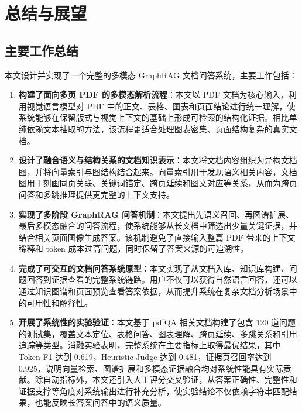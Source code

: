 
\chapter{总结与展望}\label{ch:conclusion}

\section{主要工作总结}\label{sec:summary}

本文设计并实现了一个完整的多模态 GraphRAG 文档问答系统，主要工作包括：

\begin{enumerate}[label=（\arabic*）]
\item \textbf{构建了面向多页 PDF 的多模态解析流程}：本文以 PDF 文档为核心输入，利用视觉语言模型对 PDF 中的正文、表格、图表和页面结论进行统一理解，使系统能够在保留版式与视觉上下文的基础上形成可检索的结构化证据。相比单纯依赖文本抽取的方法，该流程更适合处理图表密集、页面结构复杂的真实文档。
\item \textbf{设计了融合语义与结构关系的文档知识表示}：本文将文档内容组织为异构文档图，并将向量索引与图结构结合起来。向量索引用于发现语义相关内容，文档图用于刻画同页关联、关键词锚定、跨页延续和图文对应等关系，从而为跨页问答和多跳推理提供更完整的上下文支持。
\item \textbf{实现了多阶段 GraphRAG 问答机制}：本文提出先语义召回、再图谱扩展、最后多模态融合的问答流程，使系统能够从长文档中筛选出少量关键证据，并结合相关页面图像生成答案。该机制避免了直接输入整篇 PDF 带来的上下文稀释和 token 成本过高问题，同时保留了答案来源的可追溯性。
\item \textbf{完成了可交互的文档问答系统原型}：本文实现了从文档入库、知识库构建、问题回答到证据查看的完整系统链路。用户不仅可以获得自然语言回答，还可以通过知识图谱和页面预览查看答案依据，从而提升系统在复杂文档分析场景中的可用性和解释性。
\item \textbf{开展了系统性的实验验证}：本文基于 pdfQA 相关文档构建了包含 120 道问题的测试集，覆盖文本定位、表格问答、图表理解、跨页延续、多跳关系和引用追踪等类型。消融实验表明，完整系统在主要指标上取得最优结果，其中 Token F1 达到 0.619，Heuristic Judge 达到 0.481，证据页召回率达到 0.925，说明向量检索、图谱扩展和多模态证据融合均对系统性能具有实际贡献。除自动指标外，本文还引入人工评分交叉验证，从答案正确性、完整性和证据支撑等角度对系统输出进行补充分析，使实验结论不仅依赖字符串匹配结果，也能反映长答案问答中的语义质量。
\end{enumerate}

